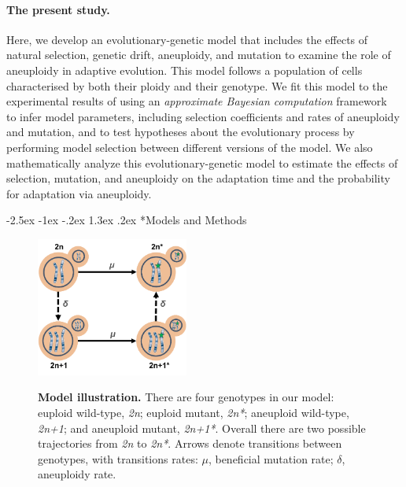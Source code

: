 \documentclass[12pt]{extarticle}
\makeatletter
\renewcommand\section{\@startsection {section}{1}{\z@}%
     {-2.5ex \@plus -1ex \@minus -.2ex}%
     {1.3ex \@plus.2ex}%
    {\Large\bfseries}}
\newcommand{\euwt}{\emph{2n}}
\newcommand{\anwt}{\emph{2n+1}}
\newcommand{\eumt}{\emph{2n*}}
\newcommand{\anmt}{\emph{2n+1*}}
\makeatother
\begin{document}
\paragraph*{The present study.}
Here, we develop an evolutionary-genetic model that includes the effects of natural selection, genetic drift, aneuploidy, and mutation to examine the role of aneuploidy in adaptive evolution.
This model follows a population of cells characterised by both their ploidy and their genotype.
We fit this model to the experimental results of \citet{Yona2012} using an \emph{approximate Bayesian computation} framework~\citep{Sisson2009} to infer model parameters, including selection coefficients and rates of aneuploidy and mutation, and to test hypotheses about the evolutionary process by performing model selection between different versions of the model.
We also mathematically analyze this evolutionary-genetic model to estimate the effects of selection, mutation, and aneuploidy on the adaptation time and the probability for adaptation via aneuploidy.


\section*{Models and Methods}

\begin{figure}[b!]
  \centering
  \includegraphics[height=1.8in]{../figures/Fig1-A.pdf}      
  \label{fig:model1}
  \caption{
    \textbf{Model illustration.}
    There are four genotypes in our model: euploid wild-type, \euwt; euploid mutant, \eumt; aneuploid wild-type, \anwt; and aneuploid mutant, \anmt.
    Overall there are two possible trajectories from \euwt\; to \eumt.
    Arrows denote transitions between genotypes, with transitions rates: $\mu$, beneficial mutation rate; $\delta$, aneuploidy rate.
  }
  \label{fig:models}
\end{figure}

\end{document}
